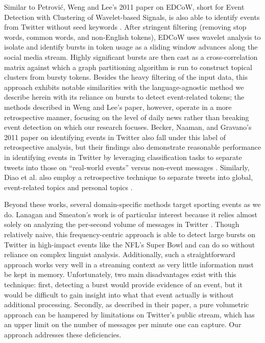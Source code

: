 \documentclass{sig-alternate}
\begin{document}
Similar to Petrovi\'{c}, Weng and Lee's 2011 paper on EDCoW, short for Event Detection with Clustering of Wavelet-based Signals, is also able to identify events from Twitter without seed keywords \cite{weng2011event}.
After stringent filtering (removing stop words, common words, and non-English tokens), EDCoW uses wavelet analysis to isolate and identify bursts in token usage as a sliding window advances along the social media stream.
Highly significant bursts are then cast as a cross-correlation matrix against which a graph partitioning algorithm is run to construct topical clusters from bursty tokens.
Besides the heavy filtering of the input data, this approach exhibits notable similarities with the language-agnostic method we describe herein with its reliance on bursts to detect event-related tokens; the methods described in Weng and Lee's paper, however, operate in a more retrospective manner, focusing on the level of daily news rather than breaking event detection on which our research focuses.
Becker, Naaman, and Gravano's 2011 paper on identifying events in Twitter also fall under this label of retrospective analysis, but their findings also demonstrate reasonable performance in identifying events in Twitter by leveraging classification tasks to separate tweets into those on ``real-world events'' versus non-event messages \cite{becker2011beyond-tr,becker2011beyond}.
Similarly, Diao et al. also employ a retrospective technique to separate tweets into global, event-related topics and personal topics \cite{diao2012finding}.

Beyond these works, several domain-specific methods target sporting events as we do\cite{vasudevan2013twitter,Zhao2011,lanagan2011using}.
Lanagan and Smeaton's work is of particular interest because it relies almost solely on analyzing the per-second volume of messages in Twitter \cite{lanagan2011using}.
Though relatively naive, this frequency-centric approach is able to detect large bursts on Twitter in high-impact events like the NFL's Super Bowl and can do so without reliance on complex linguist analysis.
Additionally, such a straightforward approach works very well in a streaming context as very little information must be kept in memory.
Unfortunately, two main disadvantages exist with this technique: first, detecting a burst would provide evidence of an event, but it would be difficult to gain insight into what that event actually is without additional processing.
Secondly, as described in their paper, a pure volumetric approach can be hampered by limitations on Twitter's public stream, which has an upper limit on the number of messages per minute one can capture.
Our approach addresses these deficiencies.
\end{document}
